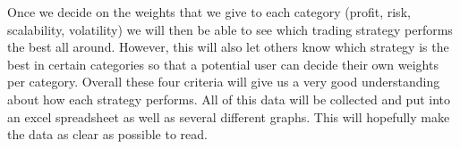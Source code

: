 Once we decide on the weights that we give to each category (profit, risk, scalability, volatility) we will then be able to see which trading strategy performs the best all around. However, this will also let others know which strategy is the best in certain categories so that a potential user can decide their own weights per category. Overall these four criteria will give us a very good understanding about how each strategy performs. All of this data will be collected and put into an excel spreadsheet as well as several different graphs. This will hopefully make the data as clear as possible to read.


